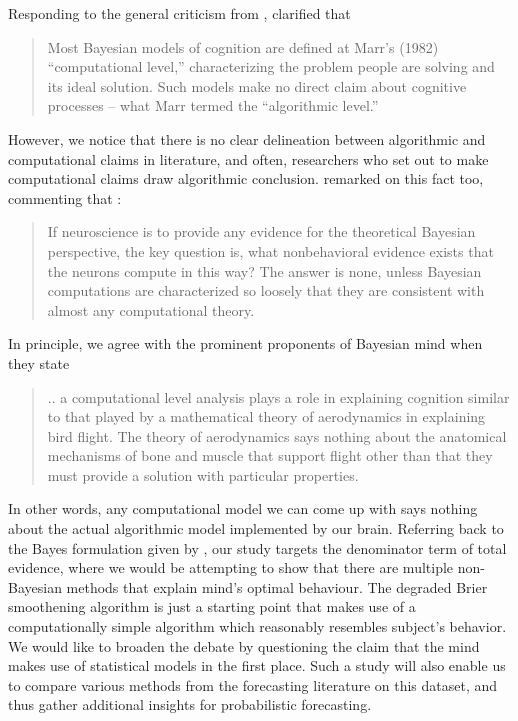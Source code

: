 \documentclass{article}
\begin{document}
Responding to the general criticism from \cite{Bowers2012BayesianJS}, \cite{griffiths2012bayesians} clarified that 
\begin{quote}
Most Bayesian models of cognition are defined at Marr's (1982) ``computational level,'' characterizing the problem people are solving and its ideal solution. Such models make no direct claim about cognitive processes -- what Marr termed the ``algorithmic level.''
\end{quote}

However, we notice that there is no clear delineation between algorithmic and computational claims in literature, and often, researchers who set out to make computational claims draw algorithmic conclusion. \cite{Bowers2012BayesianJS} remarked on this fact too, commenting that :
\begin{quote}
If neuroscience is to provide any evidence for the theoretical Bayesian perspective, the key question is, what nonbehavioral evidence exists that the neurons compute in this way? The answer is none, unless Bayesian computations are characterized so loosely that they are consistent with almost any computational theory.
\end{quote}

In principle, we agree with the prominent proponents of Bayesian mind \cite{griffiths2012bayesians} when they state 
\begin{quote}
.. a computational level analysis plays a role in explaining cognition similar to that played by a mathematical theory of aerodynamics in explaining bird flight. The theory of aerodynamics says nothing about the anatomical mechanisms of bone and muscle that support flight other than that they must provide a solution with particular properties.
\end{quote}

In other words, any computational model we can come up with says nothing about the actual algorithmic model implemented by our brain. Referring back to the Bayes formulation given by \cite{Bowers2012BayesianJS}, our study targets the denominator term of total evidence, where we would be attempting to show that there are multiple non-Bayesian methods that explain mind's optimal behaviour. The degraded Brier smoothening algorithm is just a starting point that makes use of a computationally simple algorithm which reasonably resembles subject's behavior. We would like to broaden the debate by questioning the claim that the mind makes use of statistical models in the first place. Such a study will also enable us to compare various methods from the forecasting literature on this dataset, and thus gather additional insights for probabilistic forecasting.
\end{document}
